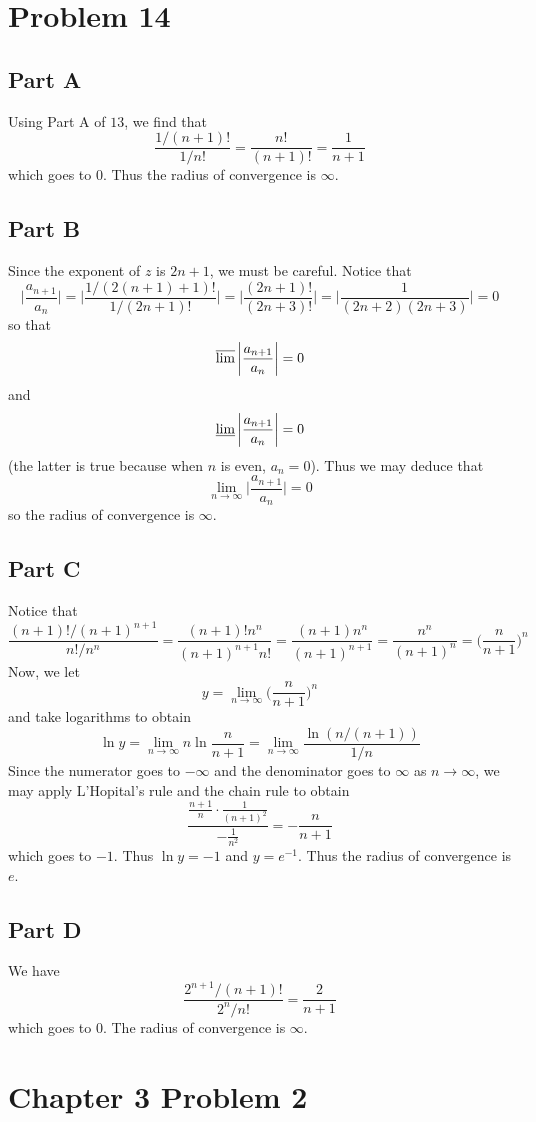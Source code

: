 \documentclass[12pt]{article}
\begin{document}
\section*{Problem 14}
\subsection*{Part A} Using Part A of $13$, we find that
\[
\frac{1/(n+1)!}{1/n!} = \frac{n!}{(n+1)!} = \frac{1}{n+1}
\] which goes to $0$. Thus the radius of convergence is $\infty$.
\subsection*{Part B}
Since the exponent of $z$ is $2n+1$, we must be careful. Notice that
\[
\bigg \vert \frac{a_{n+1}}{a_n} \bigg \vert = \bigg\vert \frac{1/(2(n+1)+1)!}{1/(2n+1)!} \bigg \vert =  \bigg\vert \frac{(2n+1)!}{(2n+3)!} \bigg \vert = \bigg \vert \frac{1}{(2n+2)(2n+3)} \bigg \vert = 0
\] so that
\[
\varlimsup \bigg \vert \frac{a_{n+1}}{a_n} \bigg \vert = 0
\]
and
\[
\varliminf \bigg \vert \frac{a_{n+1}}{a_n} \bigg \vert = 0
\] (the latter is true because when $n$ is even, $a_n = 0$). Thus we may deduce that
\[
\lim_{n\rightarrow \infty} \bigg \vert \frac{a_{n+1}}{a_n} \bigg \vert = 0
\] so the radius of convergence is $\infty$.
\subsection*{Part C}
Notice that
\[
\frac{(n+1)!/(n+1)^{n+1}}{n!/n^n} = \frac{(n+1)!n^n}{(n+1)^{n+1}n!} = \frac{(n+1)n^n}{(n+1)^{n+1}} = \frac{n^n}{(n+1)^n} = \bigg(\frac{n}{n+1}\bigg)^n
\] Now, we let 
\[
y = \lim_{n\rightarrow \infty} \bigg(\frac{n}{n+1}\bigg)^n
\] and take logarithms to obtain
\[
\ln y = \lim_{n\rightarrow \infty} n \ln \frac{n}{n+1} = \lim_{n\rightarrow \infty} \frac{\ln(n/(n+1))}{1/n}
\] Since the numerator goes to $-\infty$ and the denominator goes to $\infty$ as $n \rightarrow \infty$, we may apply L'Hopital's rule and the chain rule to obtain
\[
\frac{\frac{n+1}{n} \cdot \frac{1}{(n+1)^2} }{-\frac{1}{n^2}} = -\frac{n}{n+1}
\] which goes to $-1$. Thus $\ln y = -1$ and $y = e^{-1}$. Thus the radius of convergence is $e$.
\subsection*{Part D}
We have
\[
\frac{2^{n+1}/(n+1)!}{2^n/n!} = \frac{2}{n+1}
\] which goes to $0$. The radius of convergence is $\infty$.
\newpage
\section*{Chapter 3 Problem 2}
\end{document}
